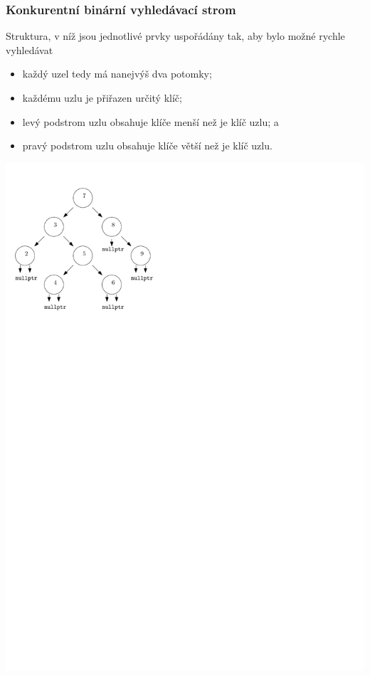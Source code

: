 \documentclass[usenames,dvipsnames,9pt]{beamer}
\begin{document}
\begin{frame}[fragile]
  \frametitle{Konkurentní binární vyhledávací strom}
  
    \begin{minipage}{0.6\linewidth}
    Struktura, v níž jsou jednotlivé prvky uspořádány tak, aby bylo možné rychle vyhledávat
    \vspace{2em}
    \begin{itemize}
    \item každý uzel tedy má nanejvýš dva potomky;
    \item každému uzlu je přiřazen určitý klíč;
    \item levý podstrom uzlu obsahuje klíče menší než je klíč uzlu; a
    \item pravý podstrom uzlu obsahuje klíče větší než je klíč uzlu.
    \end{itemize}
  \end{minipage}
  \hfill
  \begin{minipage}{0.3\linewidth}
    \includegraphics[width=1.3\linewidth]{04/figs/bst.pdf}
  \end{minipage}
\end{frame}
\end{document}
